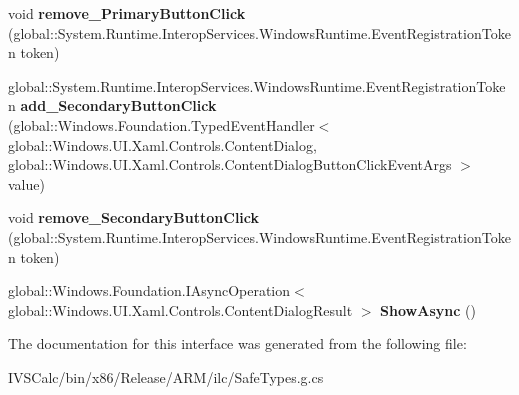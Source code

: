 \begin{DoxyCompactItemize}
\item 
\mbox{\label{interface_windows_1_1_u_i_1_1_xaml_1_1_controls_1_1_i_content_dialog_a53f3d58439fda719b2ff79bd2ff51652}} 
void {\bfseries remove\+\_\+\+Primary\+Button\+Click} (global\+::\+System.\+Runtime.\+Interop\+Services.\+Windows\+Runtime.\+Event\+Registration\+Token token)
\item 
\mbox{\label{interface_windows_1_1_u_i_1_1_xaml_1_1_controls_1_1_i_content_dialog_aabc798f8f7902cb7ff7745165632f610}} 
global\+::\+System.\+Runtime.\+Interop\+Services.\+Windows\+Runtime.\+Event\+Registration\+Token {\bfseries add\+\_\+\+Secondary\+Button\+Click} (global\+::\+Windows.\+Foundation.\+Typed\+Event\+Handler$<$ global\+::\+Windows.\+U\+I.\+Xaml.\+Controls.\+Content\+Dialog, global\+::\+Windows.\+U\+I.\+Xaml.\+Controls.\+Content\+Dialog\+Button\+Click\+Event\+Args $>$ value)
\item 
\mbox{\label{interface_windows_1_1_u_i_1_1_xaml_1_1_controls_1_1_i_content_dialog_a3174397ca2d88ef8ed1bd607efcbe4c9}} 
void {\bfseries remove\+\_\+\+Secondary\+Button\+Click} (global\+::\+System.\+Runtime.\+Interop\+Services.\+Windows\+Runtime.\+Event\+Registration\+Token token)
\item 
\mbox{\label{interface_windows_1_1_u_i_1_1_xaml_1_1_controls_1_1_i_content_dialog_a7893cebe9c1247e5e3cf46b4438e662e}} 
global\+::\+Windows.\+Foundation.\+I\+Async\+Operation$<$ global\+::\+Windows.\+U\+I.\+Xaml.\+Controls.\+Content\+Dialog\+Result $>$ {\bfseries Show\+Async} ()
\end{DoxyCompactItemize}


The documentation for this interface was generated from the following file\+:\begin{DoxyCompactItemize}
\item 
I\+V\+S\+Calc/bin/x86/\+Release/\+A\+R\+M/ilc/Safe\+Types.\+g.\+cs\end{DoxyCompactItemize}
